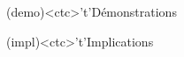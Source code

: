 \documentclass[../../main/main.tex]{subfiles}
\begin{document}
\begin{tcn}[sidebyside, fontupper=\small, fontlower=\small]
\begin{tcn}
	\end{tcn}
	\begin{tcn}(demo)<ctc>'t'{Démonstrations}
	\end{tcn}
	\begin{tcn}(impl)<ctc>'t'{Implications}
	\end{tcn}

\end{tcn}
\end{document}
